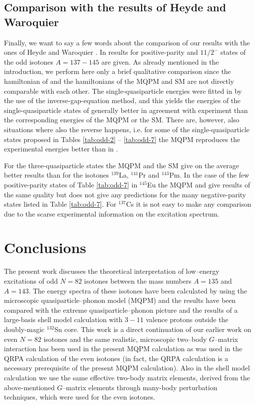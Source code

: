 \subsection{Comparison with the results of Heyde and Waroquier}

Finally, we want to say a few words about the comparison of our results with
the ones of Heyde and Waroquier \cite{HEY71}. In \cite{HEY71} results for
positive-parity and $11/2^-$ states of the odd isotones $A=137-145$ are
given. As already mentioned in the introduction, we perform here only
a brief qualitative comparison since the hamiltonian of \cite{HEY71} and
the hamiltonians of the MQPM and SM are not directly comparable with
each other. The single-quasiparticle energies were fitted in \cite{HEY71}
by the use of the inverse-gap-equation method, and this yields the
energies of the single-quasiparticle states of \cite{HEY71} generally
better in agreement with experiment than the corresponding energies of
the MQPM or the SM. There are, however, also situations where also the reverse
happens, i.e. for some of the single-quasiparticle states
proposed in Tables \ref{tab:odd-2} -- \ref{tab:odd-7} the MQPM reproduces
the experimental energies better than in \cite{HEY71}.

For the three-quasiparticle states the MQPM and the SM give on the
average better results than \cite{HEY71} for the isotones
$^{139}$La, $^{141}$Pr and $^{143}$Pm. In the case of the few 
positive-parity states of Table \ref{tab:odd-7} in $^{145}$Eu the
MQPM and \cite{HEY71} give results of the same quality but \cite{HEY71} 
does not give any predictions for the many negative-parity states listed
in Table \ref{tab:odd-7}. For $^{137}$Cs it is not easy to make any
comparison due to the scarse experimental information on the excitation
spectrum.


\section{Conclusions}\label{sec:sec5}

The present work discusses the theoretical interpretation of
low--energy excitations of odd $N=82$ isotones
between the mass numbers $A=135$ and $A=143$. The energy spectra
of these isotones have been calculated by using the microscopic
quasiparticle--phonon model (MQPM) and the results have been compared
with the extreme quasiparticle--phonon picture and the results of
a large-basis shell model calculation with $3-11$ valence protons
outside the doubly-magic $^{132}$Sn core. This work is a direct
continuation of our earlier work on even $N=82$ isotones \cite{HOL97} and the
same realistic, microscopic two--body $G$--matrix interaction
has been used in the present MQPM calculation as was used in the QRPA
calculation of the even isotones (in fact, the QRPA calculation is a
necessary prerequisite of the present MQPM calculation). 
Also in the shell model
calculation we use the same effective two-body matrix elements, 
derived from the above-mentioned $G$--matrix elements through many-body 
perturbation techniques, which were used for the even isotones.

